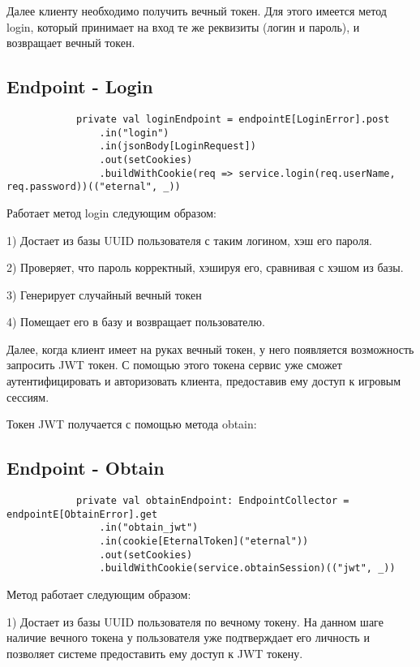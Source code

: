 \documentclass[14pt]{extarticle}
\begin{document}
    Далее клиенту необходимо получить вечный токен. Для этого имеется метод
    login, который принимает на вход те же реквизиты (логин и пароль), и возвращает
    вечный токен.
    \newpage
    \subsection{Endpoint - Login}
    \begin{verbatim}
            private val loginEndpoint = endpointE[LoginError].post
                .in("login")
                .in(jsonBody[LoginRequest])
                .out(setCookies)
                .buildWithCookie(req => service.login(req.userName, req.password))(("eternal", _))
    \end{verbatim}

    Работает метод login следующим образом:

    1) Достает из базы UUID пользователя с таким логином, хэш его пароля.

    2) Проверяет, что пароль корректный, хэшируя его, сравнивая с хэшом из базы.

    3) Генерирует случайный вечный токен

    4) Помещает его в базу и возвращает пользователю.

    Далее, когда клиент имеет на руках вечный токен, у него появляется возможность
    запросить JWT токен. С помощью этого токена сервис уже сможет аутентифицировать и авторизовать клиента,
    предоставив ему доступ к игровым сессиям.

    Токен JWT получается с помощью метода obtain:

    \subsection{Endpoint - Obtain}
    \begin{verbatim}
            private val obtainEndpoint: EndpointCollector = endpointE[ObtainError].get
                .in("obtain_jwt")
                .in(cookie[EternalToken]("eternal"))
                .out(setCookies)
                .buildWithCookie(service.obtainSession)(("jwt", _))
    \end{verbatim}

    Метод работает следующим образом:

    1) Достает из базы UUID пользователя по вечному токену. На данном шаге
    наличие вечного токена у пользователя уже подтверждает его личность и позволяет
    системе предоставить ему доступ к JWT токену.
\end{document}
